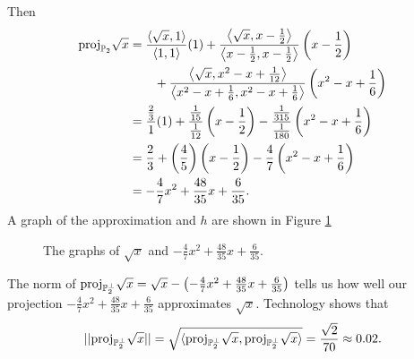\begin{example}
Then
\begin{align*}
\text{proj}_{\mathbb{P}_2} \sqrt{x} &= \frac{\left\langle \sqrt{x},1 \right\rangle}{\langle 1,1 \rangle} (1) + \frac{\left\langle \sqrt{x},x-\frac{1}{2} \right\rangle}{\left\langle x-\frac{1}{2},x-\frac{1}{2} \right\rangle} \left(x-\frac{1}{2}\right) \\
	& \qquad + \frac{\left\langle \sqrt{x}, x^2-x + \frac{1}{12} \right\rangle}{\left\langle  x^2-x + \frac{1}{6}, x^2-x + \frac{1}{6} \right\rangle} \left( x^2-x + \frac{1}{6}\right)  \\
	&= \frac{\frac{2}{3}}{1}(1) + \frac{\frac{1}{15}}{\frac{1}{12}} \left(x-\frac{1}{2}\right) - \frac{\frac{1}{315}}{\frac{1}{180}} \left(x^2-x + \frac{1}{6}\right) \\
	&= \frac{2}{3} + \left(\frac{4}{5}\right)\left(x-\frac{1}{2}\right) - \frac{4}{7}\left(x^2-x + \frac{1}{6}\right)  \\
	&= -\frac{4}{7}x^2 + \frac{48}{35}x + \frac{6}{35}.
\end{align*}
A graph of the approximation and $h$ are shown in Figure \ref{F:6_e_example_2j}
\begin{figure}[h]
\begin{center}
\end{center}
\caption{The graphs of $\sqrt{x}$ and $-\frac{4}{7}x^2 + \frac{48}{35}x + \frac{6}{35}$.}
\label{F:6_e_example_2j}
\end{figure}

\item The norm of $\text{proj}_{\mathbb{P}_2^{\perp}} \sqrt{x} = \sqrt{x} - \left(-\frac{4}{7}x^2 + \frac{48}{35}x + \frac{6}{35}\right)$ tells us how well our projection $-\frac{4}{7}x^2 + \frac{48}{35}x + \frac{6}{35}$ approximates $\sqrt{x}$. Technology shows that 
\[||\text{proj}_{\mathbb{P}_2^{\perp}} \sqrt{x}|| = \sqrt{ \langle \text{proj}_{\mathbb{P}_2^{\perp}} \sqrt{x}, \text{proj}_{\mathbb{P}_2^{\perp}} \sqrt{x}\rangle } = \frac{\sqrt{2}}{70} \approx 0.02.\]

\ea

\end{example}


